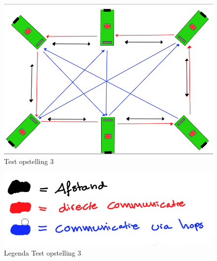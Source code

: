 \begin{figure}[h]
    \centering
    \includegraphics[scale = 0.3]{img/test3.png}
    \caption{Test opstelling 3}
    \label{fig:TestTotCom}
\end{figure}

\begin{figure}[h]
    \centering
    \includegraphics[scale = 0.3]{img/legenda_test3.png}
    \caption{Legenda Test opstelling 3}
    \label{fig:TestTotComLeg}
\end{figure}

